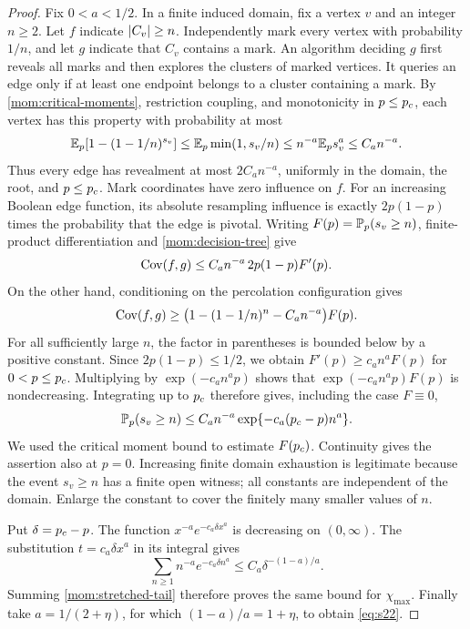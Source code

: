 \begin{proof}
Fix $0<a<1/2$.  In a finite induced domain, fix a vertex $v$ and
an integer $n\ge2$.  Let $f$ indicate $\lvert C_v\rvert\ge n$.
Independently mark every vertex with probability $1/n$, and let $g$
indicate that $C_v$ contains a mark.  An algorithm deciding $g$
first reveals all marks and then explores the clusters of marked
vertices.  It queries an edge only if at least one endpoint belongs
to a cluster containing a mark.  By \cref{mom:critical-moments},
restriction coupling, and monotonicity in $p\le{p_c}$, each vertex
has this property with probability at most
\[
 \mathbb E_p[1-(1-1/n)^{s_v}]
 \le\mathbb E_p\min(1,s_v/n)
 \le n^{-a}\mathbb E_p s_v^a\le C_a n^{-a}.
\]
Thus every edge has revealment at most $2C_a n^{-a}$, uniformly in
the domain, the root, and $p\le{p_c}$.  Mark coordinates have zero
influence on $f$.  For an increasing Boolean edge function, its
absolute resampling influence is exactly
$2p(1-p)$ times the probability that the edge is pivotal.
Writing $F(p)=\mathbb P_p(s_v\ge n)$, finite-product differentiation
and \cref{mom:decision-tree} give
\[
 \operatorname{Cov}(f,g)\le C_a n^{-a}\,2p(1-p)F'(p).
\]
On the other hand, conditioning on the percolation configuration
gives
\[
 \operatorname{Cov}(f,g)
 \ge\bigl(1-(1-1/n)^n-C_a n^{-a}\bigr)F(p).
\]
For all sufficiently large $n$, the factor in parentheses is
bounded below by a positive constant.  Since $2p(1-p)\le1/2$,
we obtain $F'(p)\ge c_a n^a F(p)$ for $0<p\le{p_c}$.
Multiplying by $\exp(-c_an^ap)$ shows that
$\exp(-c_an^ap)F(p)$ is nondecreasing.  Integrating up to ${p_c}$
therefore gives, including the case $F\equiv0$,
\begin{equation}
 \mathbb P_p(s_v\ge n)
 \le C_a n^{-a}\exp\{-c_a({p_c}-p)n^a\}.
 \label{mom:stretched-tail}
\end{equation}
We used the critical moment bound to estimate $F({p_c})$.
Continuity gives the assertion also at $p=0$.  Increasing finite
domain exhaustion is legitimate because the event $s_v\ge n$ has
a finite open witness; all constants are independent of the
domain.  Enlarge the constant to cover the finitely many smaller
values of $n$.

Put $\delta={p_c}-p$.  The function
$x^{-a}e^{-c_a\delta x^a}$ is decreasing on $(0,\infty)$.
The substitution $t=c_a\delta x^a$ in its integral gives
\[
 \sum_{n\ge1}n^{-a}e^{-c_a\delta n^a}
 \le C_a\delta^{-(1-a)/a}.
\]
Summing \eqref{mom:stretched-tail} therefore proves the same
bound for $\chi_{\max}$.  Finally take $a=1/(2+\eta)$, for which
$(1-a)/a=1+\eta$, to obtain \eqref{eq:s22}.
\end{proof}
